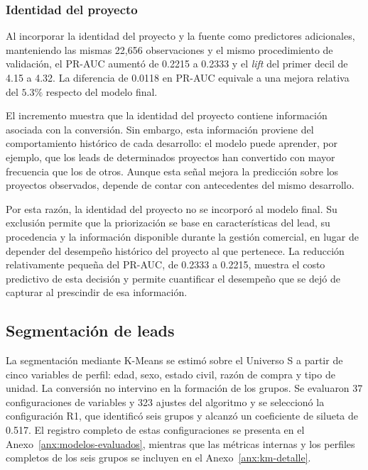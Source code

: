 \subsubsection{Identidad del proyecto}
\label{sec:disc-generalizacion}

Al incorporar la identidad del proyecto y la fuente como predictores adicionales, manteniendo las mismas 22{,}656 observaciones y el mismo procedimiento de validación, el PR-AUC aumentó de 0.2215 a 0.2333 y el \textit{lift} del primer decil de 4.15 a 4.32. La diferencia de 0.0118 en PR-AUC equivale a una mejora relativa del $5.3\%$ respecto del modelo final.

El incremento muestra que la identidad del proyecto contiene información asociada con la conversión. Sin embargo, esta información proviene del comportamiento histórico de cada desarrollo: el modelo puede aprender, por ejemplo, que los leads de determinados proyectos han convertido con mayor frecuencia que los de otros. Aunque esta señal mejora la predicción sobre los proyectos observados, depende de contar con antecedentes del mismo desarrollo.

Por esta razón, la identidad del proyecto no se incorporó al modelo final. Su exclusión permite que la priorización se base en características del lead, su procedencia y la información disponible durante la gestión comercial, en lugar de depender del desempeño histórico del proyecto al que pertenece. La reducción relativamente pequeña del PR-AUC, de 0.2333 a 0.2215, muestra el costo predictivo de esta decisión y permite cuantificar el desempeño que se dejó de capturar al prescindir de esa información.

\subsection{Segmentación de leads}
\label{subsec:km-segmentacion}

La segmentación mediante K-Means se estimó sobre el Universo S a partir de cinco variables de perfil: edad, sexo, estado civil, razón de compra y tipo de unidad. La conversión no intervino en la formación de los grupos. Se evaluaron 37 configuraciones de variables y 323 ajustes del algoritmo y se seleccionó la configuración R1, que identificó seis grupos y alcanzó un coeficiente de silueta de 0.517. El registro completo de estas configuraciones se presenta en el Anexo~\ref{anx:modelos-evaluados}, mientras que las métricas internas y los perfiles completos de los seis grupos se incluyen en el Anexo~\ref{anx:km-detalle}.


